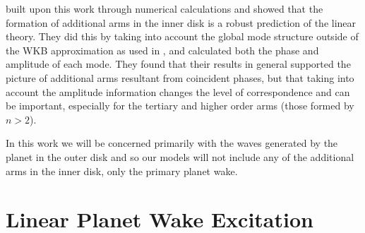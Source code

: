 \citet{miranda2019a} built upon this work through numerical calculations and showed that the formation of additional arms in the inner disk is a robust prediction of the linear theory.
They did this by taking into account the global mode structure outside of the WKB approximation as used in \citet{bae2018a}, and calculated both the phase and amplitude of each mode.
They found that their results in general supported the picture of additional arms resultant from coincident phases, but that taking into account the amplitude information changes the level of correspondence and can be important, especially for the tertiary and higher order arms (those formed by $n>2$).

In this work we will be concerned primarily with the waves generated by the planet in the outer disk and so our models will not include any of the additional arms in the inner disk, only the primary planet wake.

\section{Linear Planet Wake Excitation}

